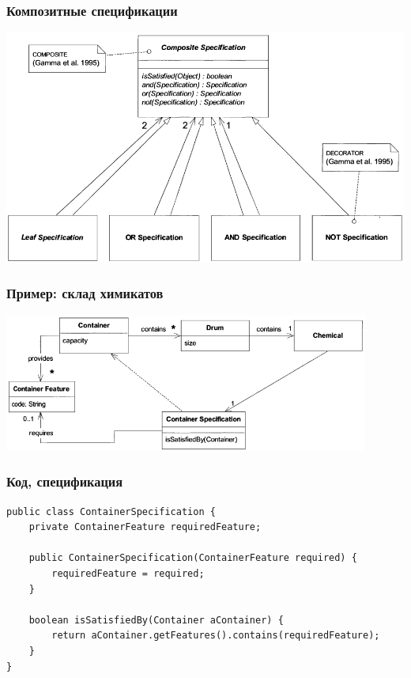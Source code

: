 \documentclass[xetex,mathserif,serif]{beamer}
\begin{document}
	\begin{frame}
		\frametitle{Композитные спецификации}
		\begin{center}
			\includegraphics[height=0.7\textheight]{compositeSpecifications.png}
		\end{center}
	\end{frame}

	\begin{frame}
		\frametitle{Пример: склад химикатов}
		\begin{center}
			\includegraphics[width=0.9\textwidth]{chemicalsStructure.png}
		\end{center}
	\end{frame}

	\begin{frame}[fragile]
		\frametitle{Код, спецификация}
		\begin{verbatim}
public class ContainerSpecification {
    private ContainerFeature requiredFeature;

    public ContainerSpecification(ContainerFeature required) {
        requiredFeature = required;
    }

    boolean isSatisfiedBy(Container aContainer) {
        return aContainer.getFeatures().contains(requiredFeature);
    }
}
		\end{verbatim}
\end{frame}
\end{document}
